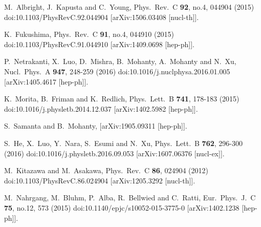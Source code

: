 \begin{thebibliography}{99}
M.~Albright, J.~Kapusta and C.~Young,
Phys.\ Rev.\ C \textbf{92}, no.4, 044904 (2015)
doi:10.1103/PhysRevC.92.044904
[arXiv:1506.03408 [nucl-th]].

K.~Fukushima,
Phys.\ Rev.\ C \textbf{91}, no.4, 044910 (2015)
doi:10.1103/PhysRevC.91.044910
[arXiv:1409.0698 [hep-ph]].

P.~Netrakanti, X.~Luo, D.~Mishra, B.~Mohanty, A.~Mohanty and N.~Xu,
Nucl.\ Phys.\ A \textbf{947}, 248-259 (2016)
doi:10.1016/j.nuclphysa.2016.01.005
[arXiv:1405.4617 [hep-ph]].

K.~Morita, B.~Friman and K.~Redlich,
Phys.\ Lett.\ B \textbf{741}, 178-183 (2015)
doi:10.1016/j.physletb.2014.12.037
[arXiv:1402.5982 [hep-ph]].

S.~Samanta and B.~Mohanty,
[arXiv:1905.09311 [hep-ph]].

S.~He, X.~Luo, Y.~Nara, S.~Esumi and N.~Xu,
Phys.\ Lett.\ B \textbf{762}, 296-300 (2016)
doi:10.1016/j.physletb.2016.09.053
[arXiv:1607.06376 [nucl-ex]].

M.~Kitazawa and M.~Asakawa,
Phys.\ Rev.\ C \textbf{86}, 024904 (2012)
doi:10.1103/PhysRevC.86.024904
[arXiv:1205.3292 [nucl-th]].

M.~Nahrgang, M.~Bluhm, P.~Alba, R.~Bellwied and C.~Ratti,
Eur.\ Phys.\ J.\ C \textbf{75}, no.12, 573 (2015)
doi:10.1140/epjc/s10052-015-3775-0
[arXiv:1402.1238 [hep-ph]].


\end{thebibliography}
